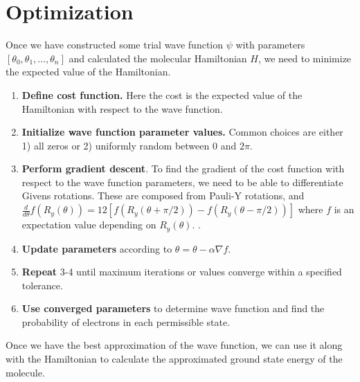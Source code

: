 \documentclass[11pt]{article}
\begin{document}
\section{Optimization}
Once we have constructed some trial wave function $\psi$ with parameters $[\theta_0,\theta_1, \dots, \theta_n]$ and calculated the molecular Hamiltonian $H$, we need to minimize the expected value of the Hamiltonian. 
\begin{enumerate}
    \item \textbf{Define cost function.} Here the cost is the expected value of the Hamiltonian with respect to the wave function.
    \item \textbf{Initialize wave function parameter values.} Common choices are either 1) all zeros or 2) uniformly random between $0$ and $2\pi$.
    \item \textbf{Perform gradient descent}. To find the gradient of the cost function with respect to the wave function parameters, we need to be able to differentiate Givens rotations. These are composed from Pauli-Y rotations, and $\frac{d}{d\theta}f(R_y(\theta)) = 12[f(R_y(\theta + \pi/2)) - f(R_y(\theta-\pi/2))]$ where $f$
 is an expectation value depending on $R_y(\theta)$. \cite{Quantum}.
    \item \textbf{Update parameters} according to $\theta = \theta - \alpha \nabla f$.
    \item \textbf{Repeat} 3-4 until maximum iterations or values converge within a specified tolerance.
    \item \textbf{Use converged parameters} to determine wave function and find the probability of electrons in each permissible state.
\end{enumerate}
Once we have the best approximation of the wave function, we can use it along with the Hamiltonian to calculate the approximated ground state energy of the molecule.
\end{document}
